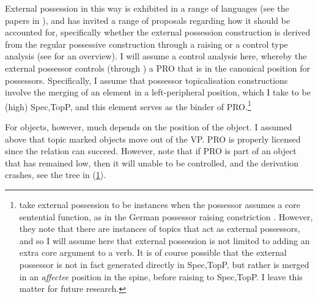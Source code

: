 \documentclass[output=paper
,modfonts
,nonflat]{langsci/langscibook}
\begin{document}


\noindent External possession in this way is exhibited in a range of languages (see the papers in \citealp{paynebarshi1999}), and has invited a range of proposals regarding how it should be accounted for, specifically whether the external possession construction is derived from the regular possessive construction through a raising or a control type analysis (see \citealt{deal2013b} for an overview). 
I will assume a control analysis here, whereby the external possessor controls (through \agree) a PRO that is in the canonical position for possessors.
Specifically, I assume that possessor topicalisation constructions involve the merging of an element in a left-peripheral position, which I take to be (high) Spec,TopP, and this element serves as the binder of PRO.\footnote{\citet{paynebarshi1999b} take external possession to be instances when the possessor assumes a core sentential function, as in the German possessor raising constriction \citep{hole2005}. However, they note that there are instances of topics that act as external possessors, and so I will assume here that external possession is not limited to adding an extra core argument to a verb.
It is of course possible that the external possessor is not in fact generated directly in Spec,TopP, but rather is merged in an \emph{affectee} position in the spine, before raising to Spec,TopP. 
I leave this matter for future research.} 


For objects, however, much depends on the position of the object. I assumed above that topic marked objects move out of the VP. PRO is properly licensed since the \agree {} relation can succeed.
However, note that if PRO is part of an object that has remained low, then it will unable to be controlled, and the derivation crashes, see the tree in (\ref{tree:objposs}).

\begin{figure}
\begin{exe}
\ex \label{tree:objposs}
\end{exe} \vspace{-0.9cm}
\end{figure}
\end{document}
